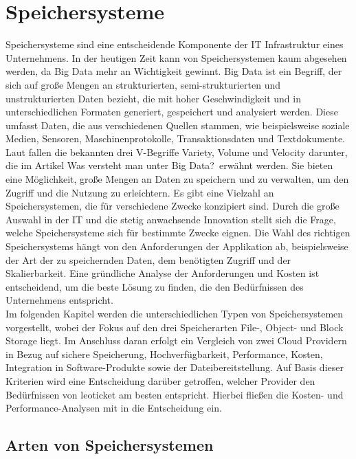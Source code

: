 \chapter{Speichersysteme}

Speichersysteme sind eine entscheidende Komponente der IT Infrastruktur eines Unternehmens. In der heutigen Zeit kann von Speichersystemen kaum abgesehen werden, da Big Data mehr an Wichtigkeit gewinnt. Big Data ist ein Begriff, der sich auf große Mengen an strukturierten, semi-strukturierten und unstrukturierten Daten bezieht, die mit hoher Geschwindigkeit und in unterschiedlichen Formaten generiert, gespeichert und analysiert werden. Diese umfasst Daten, die aus verschiedenen Quellen stammen, wie beispielsweise soziale Medien, Sensoren, Maschinenprotokolle, Transaktionsdaten und Textdokumente. Laut \citeauthor{oracle-bigdata} fallen die bekannten drei V-Begriffe Variety, Volume und Velocity darunter, die im Artikel \glqq Was versteht man unter Big Data?\grqq\ erwähnt werden. Sie bieten eine Möglichkeit, große Mengen an Daten zu speichern und zu verwalten, um den Zugriff und die Nutzung zu erleichtern. Es gibt eine Vielzahl an Speichersystemen, die für verschiedene Zwecke konzipiert sind. Durch die große Auswahl in der IT und die stetig anwachsende Innovation stellt sich die Frage, welche Speichersysteme sich für bestimmte Zwecke eignen. Die Wahl des richtigen Speichersystems hängt von den Anforderungen der Applikation ab, beispielsweise der Art der zu speichernden Daten, dem benötigten Zugriff und der Skalierbarkeit. Eine gründliche Analyse der Anforderungen und Kosten ist entscheidend, um die beste Lösung zu finden, die den Bedürfnissen des Unternehmens entspricht.\\

Im folgenden Kapitel werden die unterschiedlichen Typen von Speichersystemen vorgestellt, wobei der Fokus auf den drei Speicherarten File-, Object- und Block Storage liegt. Im Anschluss daran erfolgt ein Vergleich von zwei Cloud Providern in Bezug auf sichere Speicherung, Hochverfügbarkeit, Performance, Kosten, Integration in Software-Produkte sowie der Dateibereitstellung. Auf Basis dieser Kriterien wird eine Entscheidung darüber getroffen, welcher Provider den Bedürfnissen von leoticket am besten entspricht. Hierbei fließen die Kosten- und Performance-Analysen mit in die Entscheidung ein.

\newpage

\section{Arten von Speichersystemen}
 
